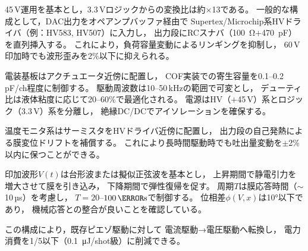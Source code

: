 \documentclass[conference]{IEEEtran}
\begin{document}
\begin{table}[t]
\centering
\caption{静電MEMSアクチュエータの駆動信号フロー構成}
\label{tab:flow}
\end{table}

45\,V運用を基本とし，3.3\,Vロジックからの変換比は約$\times$13である。
一般的な構成として，DAC出力をオペアンプバッファ経由で
Supertex/Microchip系HVドライバ（例：HV583, HV507）に入力し，
出力段にRCスナバ（\SI{100}{\ohm}+\SI{470}{pF}）を直列挿入する。
これにより，負荷容量変動によるリンギングを抑制し，
60\,V印加時でも波形歪みを2\%以下に抑えられる。

電装基板はアクチュエータ近傍に配置し，
COF実装での寄生容量を0.1--0.2\,pF/ch程度に制御する。
駆動周波数は10--50\,kHzの範囲で可変とし，
デューティ比は液体粘度に応じて20--60\%で最適化される。
電源はHV（+45\,V）系とロジック（3.3\,V）系を分離し，
絶縁DC/DCでアイソレーションを確保する。

温度モニタ系はサーミスタをHVドライバ近傍に配置し，
出力段の自己発熱による膜変位ドリフトを補償する。
これにより長時間駆動時でも吐出量変動を$\pm$2\%以内に保つことができる。

印加波形$V(t)$は台形波または擬似正弦波を基本とし，
上昇期間で静電引力を増大させて膜を引き込み，
下降期間で弾性復帰を促す。
周期$T$は膜応答時間（$\sim$10\,µs）を考慮し，
$T\!=\!20$--$100\,\mathrm{\micro s}$で制御する。
位相差$\phi(V,x)$は10°以下であり，
機械応答との整合が良いことを確認している。

この構成により，既存ピエゾ駆動に対して
電流駆動→電圧駆動へ転換し，
電力消費を1/5以下（\SI{0.1}{\micro J/shot}級）に削減できる。
\end{document}
